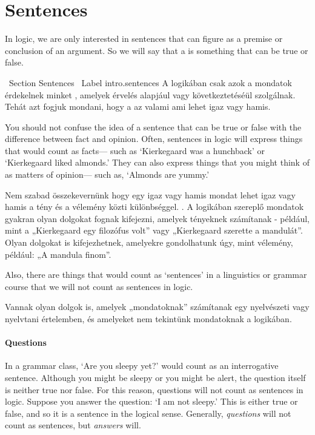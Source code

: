 \section{Sentences}
\label{intro.sentences}
In logic, we are only interested in sentences that can figure as a premise or conclusion of an argument. So we will say that a  is something that can be true or false.


\ Section {Sentences}
\ Label {intro.sentences}
A logikában csak azok a mondatok érdekelnek minket , amelyek érvelés alapjául vagy következtetéséül szolgálnak. Tehát azt fogjuk mondani, hogy a  az valami ami lehet igaz vagy hamis.


You should not confuse the idea of a sentence that can be true or false with the difference between fact and opinion. Often, sentences in logic will express things that would count as facts--- such as `Kierkegaard was a hunchback' or `Kierkegaard liked almonds.' They can also express things that you might think of as matters of opinion--- such as, `Almonds are yummy.'


Nem szabad összekevernünk hogy egy igaz vagy hamis mondat lehet igaz vagy hamis a tény és a vélemény közti különbséggel. . A logikában szereplő mondatok gyakran olyan dolgokat fognak kifejezni, amelyek tényeknek számítanak - például, mint a „Kierkegaard egy filozófus volt” vagy „Kierkegaard szerette a mandulát”. Olyan dolgokat is kifejezhetnek, amelyekre gondolhatunk úgy, mint vélemény, például: „A mandula finom”.

Also, there are things that would count as `sentences' in a linguistics or grammar course that we will not count as sentences in logic.

Vannak olyan dolgok is, amelyek „mondatoknak” számítanak egy nyelvészeti vagy nyelvtani értelemben, és amelyeket nem tekintünk mondatoknak a logikában.

\paragraph{Questions} In a grammar class, `Are you sleepy yet?' would count as an interrogative sentence. Although you might be sleepy or you might be alert, the question itself is neither true nor false. For this reason, questions will not count as sentences in logic. Suppose you answer the question: `I am not sleepy.' This is either true or false, and so it is a sentence in the logical sense. Generally, \emph{questions} will not count as sentences, but \emph{answers} will.



